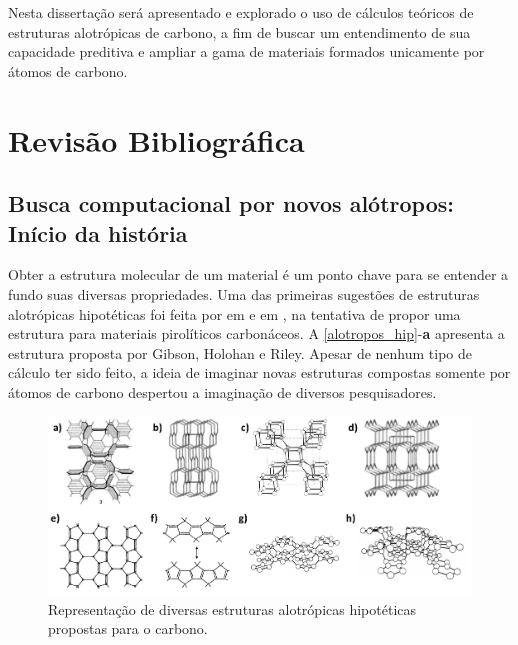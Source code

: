 	Nesta dissertação será apresentado e explorado o uso de cálculos teóricos de estruturas alotrópicas de carbono, a fim de buscar um entendimento de sua capacidade preditiva e ampliar a gama de materiais formados unicamente por átomos de carbono.
	
	
\chapter{Revisão Bibliográfica}

	\section{Busca computacional por novos alótropos: Início da história}

		Obter a estrutura molecular de um material é um ponto chave para se entender a fundo suas diversas propriedades. Uma das primeiras sugestões de estruturas alotrópicas hipotéticas foi feita por \citeauthor{gibson194687} em \citeyear{gibson194687} e \citeauthor{riley1950chemical} em \citeyear{riley1950chemical}, na tentativa de propor uma estrutura para materiais pirolíticos carbonáceos. A \autoref{alotropos_hip}-\textbf{a} apresenta a estrutura proposta por Gibson, Holohan e Riley. Apesar de nenhum tipo de cálculo ter sido feito, a ideia de imaginar novas estruturas compostas somente por átomos de carbono despertou a imaginação de diversos pesquisadores.
		
			
		\begin{figure}[!h]
			\centering
			\includegraphics[width=1\linewidth]{capitulos/fig/intro/alotropos_hipoteticos}
			\caption{Representação de diversas estruturas alotrópicas hipotéticas propostas para o carbono.}
			\label{alotropos_hip}
		\end{figure}
	
